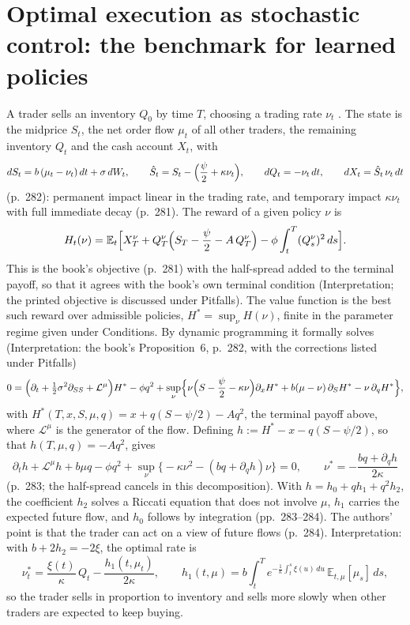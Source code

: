 \section{Optimal execution as stochastic control: the benchmark for learned policies}

\begin{qfmodel}\label{mod:cartea-jaimungal-execution}
 A trader sells an inventory $Q_0$ by time $T$, choosing a trading rate $\nu_t$ \citep[app.~A, sec.~A.7.3, pp.~281--282]{alpha-laruelle}. The state is the midprice $S_t$, the net order flow $\mu_t$ of all other traders, the remaining inventory $Q_t$ and the cash account $X_t$, with
\[ dS_t=b\,(\mu_t-\nu_t)\,dt+\sigma\,dW_t,\qquad \hat S_t=S_t-\Bigl(\frac\psi2+\kappa\nu_t\Bigr),\qquad dQ_t=-\nu_t\,dt,\qquad dX_t=\hat S_t\,\nu_t\,dt \]
(p.~282): permanent impact linear in the trading rate, and temporary impact $\kappa\nu_t$ with full immediate decay (p.~281). The reward of a given policy $\nu$ is
\[ H_t(\nu)=\mathbb E_t\Bigl[X_T^\nu+Q_T^\nu\Bigl(S_T-\frac\psi2-A\,Q_T^\nu\Bigr)-\phi\int_t^T(Q_s^\nu)^2\,ds\Bigr]. \]
This is the book's objective (p.~281) with the half-spread added to the terminal payoff, so that it agrees with the book's own terminal condition (Interpretation; the printed objective is discussed under Pitfalls). The value function is the best such reward over admissible policies, $H^*=\sup_\nu H(\nu)$, finite in the parameter regime given under Conditions. By dynamic programming it formally solves (Interpretation: the book's Proposition~6, p.~282, with the corrections listed under Pitfalls)
\[ 0=\Bigl(\partial_t+\tfrac12\sigma^2\partial_{SS}+\mathcal L^\mu\Bigr)H^*-\phi q^2+\sup_\nu\Bigl\{\nu\Bigl(S-\frac\psi2-\kappa\nu\Bigr)\partial_xH^*+b(\mu-\nu)\,\partial_SH^*-\nu\,\partial_qH^*\Bigr\}, \]
with $H^*(T,x,S,\mu,q)=x+q(S-\psi/2)-Aq^2$, the terminal payoff above, where $\mathcal L^\mu$ is the generator of the flow. Defining $h:=H^*-x-q(S-\psi/2)$, so that $h(T,\mu,q)=-Aq^2$, gives
\[ \partial_th+\mathcal L^\mu h+b\mu q-\phi q^2+\sup_\nu\bigl\{-\kappa\nu^2-(bq+\partial_qh)\nu\bigr\}=0,\qquad \nu^*=-\frac{bq+\partial_qh}{2\kappa} \]
(p.~283; the half-spread cancels in this decomposition). With $h=h_0+qh_1+q^2h_2$, the coefficient $h_2$ solves a Riccati equation that does not involve $\mu$, $h_1$ carries the expected future flow, and $h_0$ follows by integration (pp.~283--284). The authors' point is that the trader can act on a view of future flows (p.~284). Interpretation: with $b+2h_2=-2\xi$, the optimal rate is
\[ \nu_t^*=\frac{\xi(t)}{\kappa}\,Q_t-\frac{h_1(t,\mu_t)}{2\kappa},\qquad h_1(t,\mu)=b\int_t^Te^{-\frac1\kappa\int_t^s\xi(u)\,du}\,\mathbb E_{t,\mu}[\mu_s]\,ds, \]
so the trader sells in proportion to inventory and sells more slowly when other traders are expected to keep buying.


\end{qfmodel}
